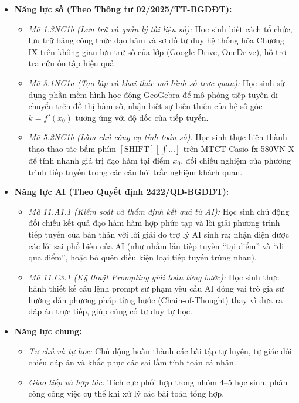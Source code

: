 \documentclass[12pt, a4paper]{article}
\begin{document}
\begin{itemize}[leftmargin=1.2cm]
    \item \textbf{Năng lực số (Theo Thông tư 02/2025/TT-BGDĐT):}
    \begin{itemize}[leftmargin=0.6cm]
        \item \textit{Mã 1.3NC1b (Lưu trữ và quản lý tài liệu số):} Học sinh biết cách tổ chức, lưu trữ bảng công thức đạo hàm và sơ đồ tư duy hệ thống hóa Chương IX trên không gian lưu trữ số của lớp (Google Drive, OneDrive), hỗ trợ tra cứu ôn tập hiệu quả.
        \item \textit{Mã 3.1NC1a (Tạo lập và khai thác mô hình số trực quan):} Học sinh sử dụng phần mềm hình học động GeoGebra để mô phỏng tiếp tuyến di chuyển trên đồ thị hàm số, nhận biết sự biến thiên của hệ số góc $k = f'(x_0)$ tương ứng với độ dốc của tiếp tuyến.
        \item \textit{Mã 5.2NC1b (Làm chủ công cụ tính toán số):} Học sinh thực hiện thành thạo thao tác bấm phím $\left[\text{SHIFT}\right] \left[\int \dots \right]$ trên MTCT Casio fx-580VN X để tính nhanh giá trị đạo hàm tại điểm $x_0$, đối chiếu nghiệm của phương trình tiếp tuyến trong các câu hỏi trắc nghiệm khách quan.
    \end{itemize}

    \item \textbf{Năng lực AI (Theo Quyết định 2422/QĐ-BGDĐT):}
    \begin{itemize}[leftmargin=0.6cm]
        \item \textit{Mã 11.A1.1 (Kiểm soát và thẩm định kết quả từ AI):} Học sinh chủ động đối chiếu kết quả đạo hàm hàm hợp phức tạp và lời giải phương trình tiếp tuyến của bản thân với lời giải do trợ lý AI sinh ra; nhận diện được các lỗi sai phổ biến của AI (như nhầm lẫn tiếp tuyến ``tại điểm'' và ``đi qua điểm'', hoặc bỏ quên điều kiện loại tiếp tuyến trùng nhau).
        \item \textit{Mã 11.C3.1 (Kỹ thuật Prompting giải toán từng bước):} Học sinh thực hành thiết kế câu lệnh prompt sư phạm yêu cầu AI đóng vai trò gia sư hướng dẫn phương pháp từng bước (Chain-of-Thought) thay vì đưa ra đáp án trực tiếp, giúp củng cố tư duy tự học.
    \end{itemize}

    \item \textbf{Năng lực chung:}
    \begin{itemize}[leftmargin=0.6cm]
        \item \textit{Tự chủ và tự học:} Chủ động hoàn thành các bài tập tự luyện, tự giác đối chiếu đáp án và khắc phục các sai lầm tính toán cá nhân.
        \item \textit{Giao tiếp và hợp tác:} Tích cực phối hợp trong nhóm 4--5 học sinh, phân công công việc cụ thể khi xử lý các bài toán tổng hợp.
    \end{itemize}
\end{itemize}
\end{document}
